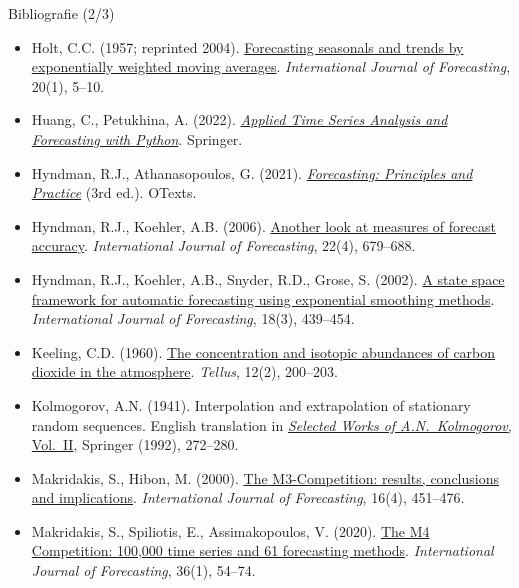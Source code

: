 \begin{frame}{Bibliografie (2/3)}
\itemsize{\scriptsize}
\begin{itemize}
    \item Holt, C.C. (1957; reprinted 2004). \href{https://doi.org/10.1016/j.ijforecast.2003.09.015}{Forecasting seasonals and trends by exponentially weighted moving averages}. \emph{International Journal of Forecasting}, 20(1), 5--10.
    \item Huang, C., Petukhina, A. (2022). \href{https://doi.org/10.1007/978-3-031-13584-2}{\emph{Applied Time Series Analysis and Forecasting with Python}}. Springer.
    \item Hyndman, R.J., Athanasopoulos, G. (2021). \href{https://otexts.com/fpp3/}{\emph{Forecasting: Principles and Practice}} (3rd ed.). OTexts.
    \item Hyndman, R.J., Koehler, A.B. (2006). \href{https://doi.org/10.1016/j.ijforecast.2006.03.001}{Another look at measures of forecast accuracy}. \emph{International Journal of Forecasting}, 22(4), 679--688.
    \item Hyndman, R.J., Koehler, A.B., Snyder, R.D., Grose, S. (2002). \href{https://doi.org/10.1016/S0169-2070(01)00110-8}{A state space framework for automatic forecasting using exponential smoothing methods}. \emph{International Journal of Forecasting}, 18(3), 439--454.
    \item Keeling, C.D. (1960). \href{https://doi.org/10.3402/tellusa.v12i2.9366}{The concentration and isotopic abundances of carbon dioxide in the atmosphere}. \emph{Tellus}, 12(2), 200--203.
    \item Kolmogorov, A.N. (1941). Interpolation and extrapolation of stationary random sequences. English translation in \href{https://doi.org/10.1007/978-94-011-2260-3_28}{\emph{Selected Works of A.N.\ Kolmogorov}, Vol.\ II}, Springer (1992), 272--280.
    \item Makridakis, S., Hibon, M. (2000). \href{https://doi.org/10.1016/S0169-2070(00)00057-1}{The M3-Competition: results, conclusions and implications}. \emph{International Journal of Forecasting}, 16(4), 451--476.
    \item Makridakis, S., Spiliotis, E., Assimakopoulos, V. (2020). \href{https://doi.org/10.1016/j.ijforecast.2019.04.014}{The M4 Competition: 100,000 time series and 61 forecasting methods}. \emph{International Journal of Forecasting}, 36(1), 54--74.
\end{itemize}
\end{frame}

